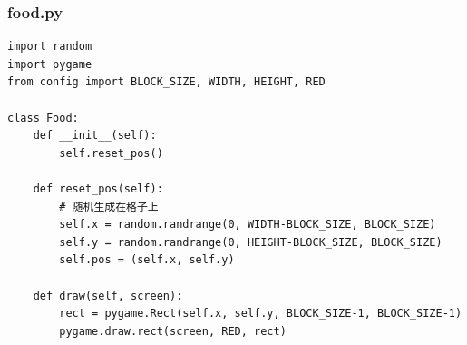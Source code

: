 \subsubsection*{food.py}
\lstset{language=Python}
\begin{lstlisting}
import random
import pygame
from config import BLOCK_SIZE, WIDTH, HEIGHT, RED

class Food:
    def __init__(self):
        self.reset_pos()

    def reset_pos(self):
        # 随机生成在格子上
        self.x = random.randrange(0, WIDTH-BLOCK_SIZE, BLOCK_SIZE)
        self.y = random.randrange(0, HEIGHT-BLOCK_SIZE, BLOCK_SIZE)
        self.pos = (self.x, self.y)

    def draw(self, screen):
        rect = pygame.Rect(self.x, self.y, BLOCK_SIZE-1, BLOCK_SIZE-1)
        pygame.draw.rect(screen, RED, rect)
\end{lstlisting}


